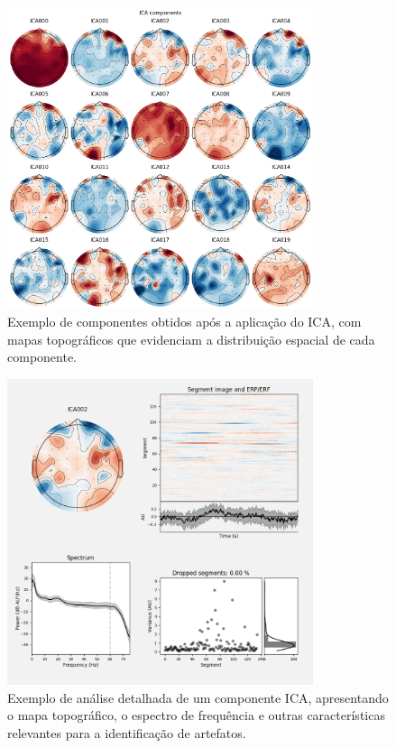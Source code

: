 \begin{figure}[htb]
    \centering
    \includegraphics[width=0.8\textwidth]{figs/1_preprocessamento_eeg/3_exemplo_compomentes_pos_ICA.png}
    \caption{Exemplo de componentes obtidos após a aplicação do ICA, com mapas topográficos que evidenciam a distribuição espacial de cada componente.}
    \label{fig:componentes_pos_ICA}
\end{figure}

\begin{figure}[htb]
    \centering
    \includegraphics[width=0.8\textwidth]{figs/1_preprocessamento_eeg/4_exemplo_ICA_component_analysis.png}
    \caption{Exemplo de análise detalhada de um componente ICA, apresentando o mapa topográfico, o espectro de frequência e outras características relevantes para a identificação de artefatos.}
    \label{fig:exemplo_ICA_component_analysis}
\end{figure}


